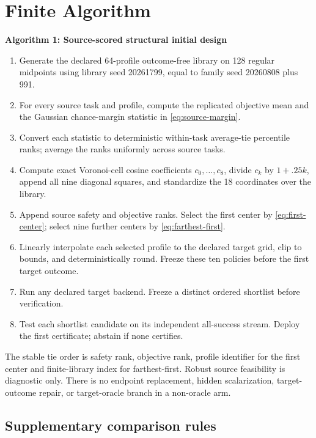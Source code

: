 \section{Finite Algorithm}\label{app:algorithm}

\noindent\textbf{Algorithm 1: Source-scored structural initial design}
\begingroup
\small
\begin{enumerate}
\item Generate the declared 64-profile outcome-free library on 128 regular
midpoints using library seed 20261799, equal to family seed 20260808 plus 991.
\item For every source task and profile, compute the replicated objective mean
and the Gaussian chance-margin statistic in \eqref{eq:source-margin}.
\item Convert each statistic to deterministic within-task average-tie
percentile ranks; average the ranks uniformly across source tasks.
\item Compute exact Voronoi-cell cosine coefficients $c_0,\ldots,c_8$, divide
$c_k$ by $1+.25k$, append all nine diagonal squares, and standardize the 18
coordinates over the library.
\item Append source safety and objective ranks.  Select the first center by
\eqref{eq:first-center}; select nine further centers by
\eqref{eq:farthest-first}.
\item Linearly interpolate each selected profile to the declared target grid,
clip to bounds, and deterministically round.  Freeze these ten policies before
the first target outcome.
\item Run any declared target backend.  Freeze a distinct ordered shortlist
before verification.
\item Test each shortlist candidate on its independent all-success stream.
Deploy the first certificate; abstain if none certifies.
\end{enumerate}
\endgroup

The stable tie order is safety rank, objective rank, profile identifier for the
first center and finite-library index for farthest-first.  Robust source
feasibility is diagnostic only.  There is no endpoint replacement, hidden
scalarization, target-outcome repair, or target-oracle branch in a non-oracle
arm.

\subsection{Supplementary comparison rules}\label{app:supplemental-controls}


